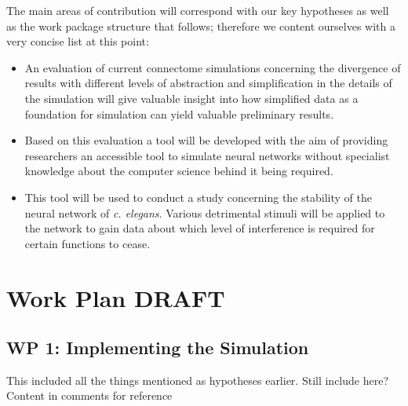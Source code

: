 \documentclass[a4paper,11pt]{article}
\begin{document}
The main areas of contribution will correspond with our key hypotheses as well as the work package structure that follows; therefore we content ourselves with a very concise list at this point:
\begin{itemize} 
  \item An evaluation of current connectome simulations concerning the divergence of results with different levels of abstraction and simplification in the details of the simulation will give valuable insight into how simplified data as a foundation for simulation can yield valuable preliminary results.
  \item Based on this evaluation a tool will be developed with the aim of providing researchers an accessible tool to simulate neural networks without specialist knowledge about the computer science behind it being required.
  \item This tool will be used to conduct a study concerning the stability of the neural network of \emph{c. elegans}. Various detrimental stimuli will be applied to the network to gain data about which level of interference is required for certain functions to cease.
\end{itemize}


%

\section{Work Plan DRAFT}

\subsection{WP 1: Implementing the Simulation}

This included all the things mentioned as hypotheses earlier. Still include here? Content in comments for reference 


\end{document}

